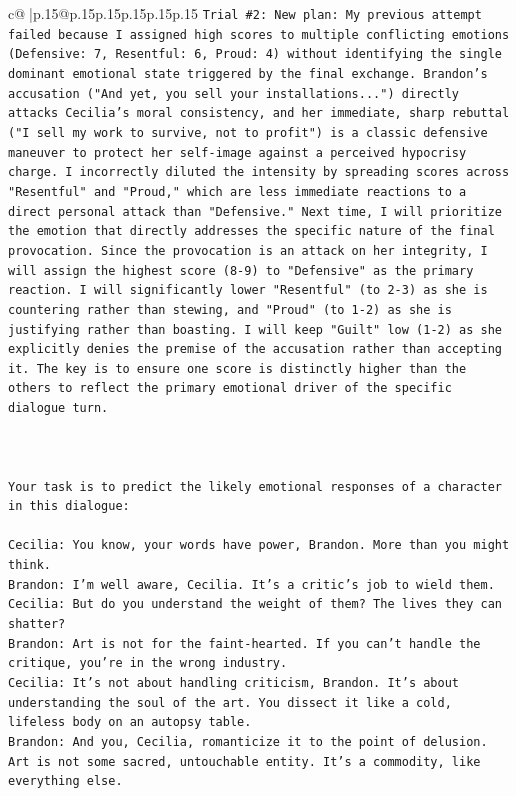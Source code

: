 \documentclass{article}
\begin{document}
{\begin{supertabular}{c@{$\;$}|p{.15\linewidth}@{}p{.15\linewidth}p{.15\linewidth}p{.15\linewidth}p{.15\linewidth}p{.15\linewidth}}
{{{\texttt{Trial \#2: New plan: My previous attempt failed because I assigned high scores to multiple conflicting emotions (Defensive: 7, Resentful: 6, Proud: 4) without identifying the single dominant emotional state triggered by the final exchange. Brandon's accusation ("And yet, you sell your installations...") directly attacks Cecilia's moral consistency, and her immediate, sharp rebuttal ("I sell my work to survive, not to profit") is a classic defensive maneuver to protect her self{-}image against a perceived hypocrisy charge. I incorrectly diluted the intensity by spreading scores across "Resentful" and "Proud," which are less immediate reactions to a direct personal attack than "Defensive." Next time, I will prioritize the emotion that directly addresses the specific nature of the final provocation. Since the provocation is an attack on her integrity, I will assign the highest score (8{-}9) to "Defensive" as the primary reaction. I will significantly lower "Resentful" (to 2{-}3) as she is countering rather than stewing, and "Proud" (to 1{-}2) as she is justifying rather than boasting. I will keep "Guilt" low (1{-}2) as she explicitly denies the premise of the accusation rather than accepting it. The key is to ensure one score is distinctly higher than the others to reflect the primary emotional driver of the specific dialogue turn.} \\
\\ 
\\ 
\\ 
\texttt{Your task is to predict the likely emotional responses of a character in this dialogue:} \\
\\ 
\texttt{Cecilia: You know, your words have power, Brandon. More than you might think.} \\
\texttt{Brandon: I'm well aware, Cecilia. It's a critic's job to wield them.} \\
\texttt{Cecilia: But do you understand the weight of them? The lives they can shatter?} \\
\texttt{Brandon: Art is not for the faint{-}hearted. If you can't handle the critique, you're in the wrong industry.} \\
\texttt{Cecilia: It's not about handling criticism, Brandon. It's about understanding the soul of the art. You dissect it like a cold, lifeless body on an autopsy table.} \\
\texttt{Brandon: And you, Cecilia, romanticize it to the point of delusion. Art is not some sacred, untouchable entity. It's a commodity, like everything else.} \\
}}}
\end{supertabular}}
\end{document}
